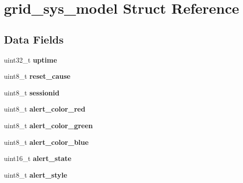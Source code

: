\hypertarget{structgrid__sys__model}{\section{grid\-\_\-sys\-\_\-model Struct Reference}
\label{structgrid__sys__model}
}
\subsection*{Data Fields}
\begin{DoxyCompactItemize}
\item 
\hypertarget{structgrid__sys__model_a35c6b00f0dadd1ec305e16bd6fc435a7}{uint32\-\_\-t {\bfseries uptime}}\label{structgrid__sys__model_a35c6b00f0dadd1ec305e16bd6fc435a7}

\item 
\hypertarget{structgrid__sys__model_acb4fd5cf37d76706e269625fb76d1df7}{uint8\-\_\-t {\bfseries reset\-\_\-cause}}\label{structgrid__sys__model_acb4fd5cf37d76706e269625fb76d1df7}

\item 
\hypertarget{structgrid__sys__model_a9e3599f9d0c6f8a32f204efde16e56f6}{uint8\-\_\-t {\bfseries sessionid}}\label{structgrid__sys__model_a9e3599f9d0c6f8a32f204efde16e56f6}

\item 
\hypertarget{structgrid__sys__model_ab6131d5e0aa20b6c61fa809f9913dd3e}{uint8\-\_\-t {\bfseries alert\-\_\-color\-\_\-red}}\label{structgrid__sys__model_ab6131d5e0aa20b6c61fa809f9913dd3e}

\item 
\hypertarget{structgrid__sys__model_a0eb29fce00ff611a02d325f279edcc66}{uint8\-\_\-t {\bfseries alert\-\_\-color\-\_\-green}}\label{structgrid__sys__model_a0eb29fce00ff611a02d325f279edcc66}

\item 
\hypertarget{structgrid__sys__model_a15bde028d84fe086301e8d8167db1877}{uint8\-\_\-t {\bfseries alert\-\_\-color\-\_\-blue}}\label{structgrid__sys__model_a15bde028d84fe086301e8d8167db1877}

\item 
\hypertarget{structgrid__sys__model_a82e5454c38d78f2d406f8deda2636f51}{uint16\-\_\-t {\bfseries alert\-\_\-state}}\label{structgrid__sys__model_a82e5454c38d78f2d406f8deda2636f51}

\item 
\hypertarget{structgrid__sys__model_a34d80861fd551e68ac61679e6ab18fa6}{uint8\-\_\-t {\bfseries alert\-\_\-style}}\label{structgrid__sys__model_a34d80861fd551e68ac61679e6ab18fa6}


\end{DoxyCompactItemize}
